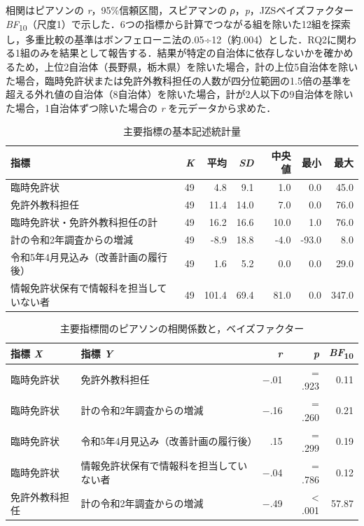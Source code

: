 \documentclass[a4paper,10pt,twocolumn]{ltjsarticle}
\begin{document}
相関はピアソンの \textit{r}，95\%信頼区間，スピアマンの \textit{ρ}，\textit{p}，JZSベイズファクター \textit{BF}\textsubscript{10}（尺度1）で示した．6つの指標から計算でつながる組を除いた12組を探索し，多重比較の基準はボンフェローニ法の.05÷12（約.004）とした．RQ2に関わる1組のみを結果として報告する．結果が特定の自治体に依存しないかを確かめるため，上位2自治体（長野県，栃木県）を除いた場合，計の上位5自治体を除いた場合，臨時免許状または免許外教科担任の人数が四分位範囲の1.5倍の基準を超える外れ値の自治体（8自治体）を除いた場合，計が2人以下の9自治体を除いた場合，1自治体ずつ除いた場合の \textit{r} を元データから求めた．
\begin{table}[!t]
\caption{主要指標の基本記述統計量}
\centering\small
\begin{tabular}{>{\raggedright\arraybackslash}p{9.2cm}rrrrrr}
\toprule
指標 & \textit{K} & 平均 & \textit{SD} & 中央値 & 最小 & 最大 \\
\midrule
臨時免許状 & 49 & 4.8 & 9.1 & 1.0 & 0.0 & 45.0 \\
免許外教科担任 & 49 & 11.4 & 14.0 & 7.0 & 0.0 & 76.0 \\
臨時免許状・免許外教科担任の計 & 49 & 16.2 & 16.6 & 10.0 & 1.0 & 76.0 \\
計の令和2年調査からの増減 & 49 & -8.9 & 18.8 & -4.0 & -93.0 & 8.0 \\
令和5年4月見込み（改善計画の履行後） & 49 & 1.6 & 5.2 & 0.0 & 0.0 & 29.0 \\
情報免許状保有で情報科を担当していない者 & 49 & 101.4 & 69.4 & 81.0 & 0.0 & 347.0 \\
\bottomrule
\end{tabular}
\par{}
\end{table}
\begin{table}[!t]
\caption{主要指標間のピアソンの相関係数と，ベイズファクター}
\centering\small
\begin{tabular}{>{\raggedright\arraybackslash}p{6.4cm}>{\raggedright\arraybackslash}p{6.4cm}rrr}
\toprule
指標 \textit{X} & 指標 \textit{Y} & \textit{r} & \textit{p} & \textit{BF}\textsubscript{10} \\
\midrule
臨時免許状 & 免許外教科担任 & −.01 & = .923 & 0.11 \\
臨時免許状 & 計の令和2年調査からの増減 & −.16 & = .260 & 0.21 \\
臨時免許状 & 令和5年4月見込み（改善計画の履行後） & .15 & = .299 & 0.19 \\
臨時免許状 & 情報免許状保有で情報科を担当していない者 & −.04 & = .786 & 0.12 \\
免許外教科担任 & 計の令和2年調査からの増減 & −.49 & < .001 & 57.87 \\
\bottomrule
\end{tabular}
\par{}
\end{table}
\end{document}
